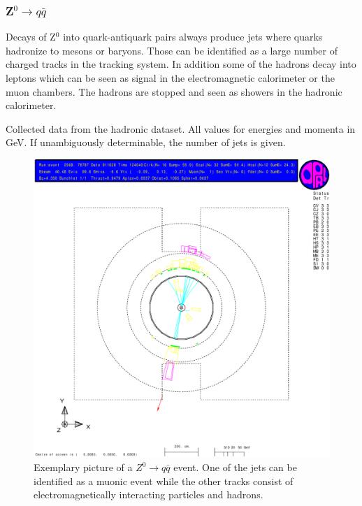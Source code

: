 \documentclass[11pt, a4paper]{article}
\numberwithin{equation}{section}
\begin{document}
\subsubsection{Z$^0\rightarrow q\bar{q}$}

Decays of Z$^0$ into quark-antiquark pairs always produce jets where quarks hadronize to mesons or baryons.
Those can be identified as a large number of charged tracks in the tracking system.
In addition some of the hadrons decay into leptons which can be seen as signal in the electromagnetic calorimeter or the muon chambers.
The hadrons are stopped and seen as showers in the hadronic calorimeter.
\begin{table}
	\centering
	
	\caption{Collected data from the hadronic dataset. All values for energies and momenta in \si{GeV}. If unambiguously determinable, the number of jets is given.}
\end{table}
\begin{figure}[h]
	\centering
	\includegraphics[width=\textwidth]{./data/tag1/qq_pics/cropped/qq_04}
	\caption{Exemplary picture of a $Z^0\rightarrow q\bar{q}$ event. One of the jets can be identified as a muonic event while the other tracks consist of electromagnetically interacting particles and hadrons.}
\end{figure}
\clearpage
\end{document}
